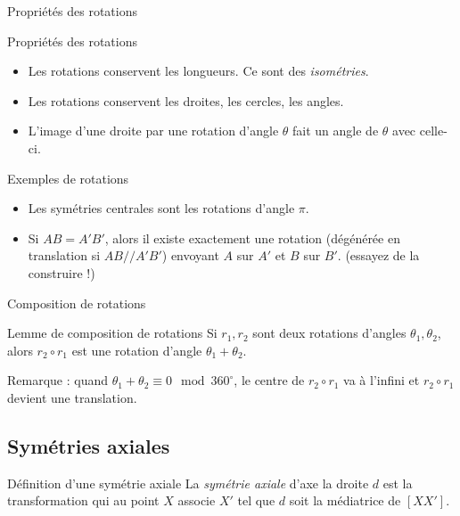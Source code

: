 \documentclass[french]{beamer}
\theoremstyle{plain}
\begin{document}
\begin{frame}{Propriétés des rotations}
  \begin{exampleblock}{Propriétés des rotations}
    \begin{itemize}
      \item Les rotations conservent les longueurs. Ce sont des \textit{isométries}.
      \item Les rotations conservent les droites, les cercles, les angles.
      \item L’image d’une droite par une rotation d’angle $ \theta $ fait un angle de $ \theta $ avec celle-ci.
    \end{itemize}
  \end{exampleblock}
\end{frame}


\begin{frame}{Exemples de rotations}
  \begin{itemize}
    \item Les symétries centrales sont les rotations d'angle $ \pi $.
    \item Si $ AB = A'B' $, alors il existe exactement une rotation (dégénérée en translation si $ AB /\!/ A'B' $) envoyant $A$ sur $ A'$ et $ B $ sur $ B' $. (essayez de la construire !)
  \end{itemize}
\end{frame}


\begin{frame}{Composition de rotations}
  \begin{exampleblock}{Lemme de composition de rotations}
    Si $ r_1, r_2 $ sont deux rotations d'angles $ \theta_1, \theta_2 $, alors $ r_2 \circ r_1 $ est une rotation d'angle $ \theta_1 + \theta_2 $.
  \end{exampleblock}
  Remarque : quand $ \theta_1 + \theta_2 \equiv 0 \mod 360^\circ $, le centre de $ r_2 \circ r_1 $ va à l'infini et $ r_2 \circ r_1 $ devient une translation.
\end{frame}


\subsection{Symétries axiales}
\begin{frame}{Définition d'une symétrie axiale}
  La \textit{symétrie axiale} d'axe la droite $ d $ est la transformation qui au point $ X $ associe $ X' $ tel que $ d $ soit la médiatrice de $ [XX'] $.
\end{frame}
\end{document}
